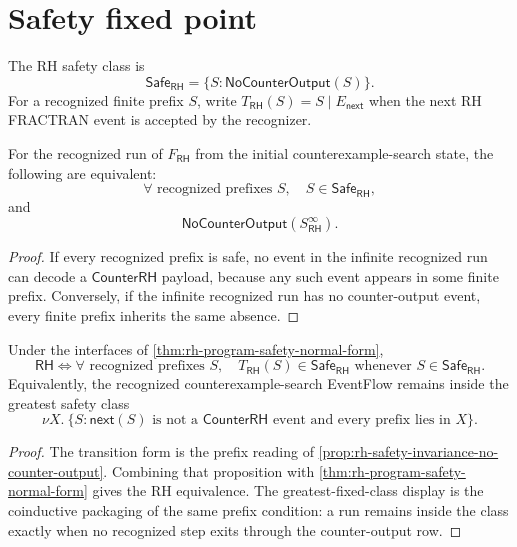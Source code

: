 \section{Safety fixed point}
\label{sec:rh-counterprogram-safety-fixed-point}

\begin{definition}
\label{def:rh-safety-class}
The RH safety class is
$$
\mathsf{Safe}_{\mathsf{RH}}
=
\{S:\mathsf{NoCounterOutput}(S)\}.
$$
For a recognized finite prefix $S$, write
$T_{\mathsf{RH}}(S)=S\mid E_{\mathsf{next}}$ when the next RH FRACTRAN
event is accepted by the recognizer.
\end{definition}

\begin{proposition}
\label{prop:rh-safety-invariance-no-counter-output}
For the recognized run of $F_{\mathsf{RH}}$ from the initial
counterexample-search state, the following are equivalent:
$$
\forall\text{ recognized prefixes }S,\quad
S\in\mathsf{Safe}_{\mathsf{RH}},
$$
and
$$
\mathsf{NoCounterOutput}(S_{\mathsf{RH}}^\infty).
$$
\end{proposition}

\begin{proof}
If every recognized prefix is safe, no event in the infinite recognized run
can decode a $\mathsf{CounterRH}$ payload, because any such event appears in
some finite prefix.  Conversely, if the infinite recognized run has no
counter-output event, every finite prefix inherits the same absence.
\end{proof}

\begin{corollary}
\label{cor:rh-safety-fixed-point}
Under the interfaces of \autoref{thm:rh-program-safety-normal-form},
$$
\mathsf{RH}
\Longleftrightarrow
\forall\text{ recognized prefixes }S,\quad
T_{\mathsf{RH}}(S)\in\mathsf{Safe}_{\mathsf{RH}}
\text{ whenever }S\in\mathsf{Safe}_{\mathsf{RH}}.
$$
Equivalently, the recognized counterexample-search EventFlow remains inside
the greatest safety class
$$
\nu X.\ \{S:\mathsf{next}(S)\text{ is not a }\mathsf{CounterRH}
\text{ event and every prefix lies in }X\}.
$$
\end{corollary}

\begin{proof}
The transition form is the prefix reading of
\autoref{prop:rh-safety-invariance-no-counter-output}.  Combining that
proposition with \autoref{thm:rh-program-safety-normal-form} gives the RH
equivalence.  The greatest-fixed-class display is the coinductive packaging
of the same prefix condition: a run remains inside the class exactly when no
recognized step exits through the counter-output row.
\end{proof}

